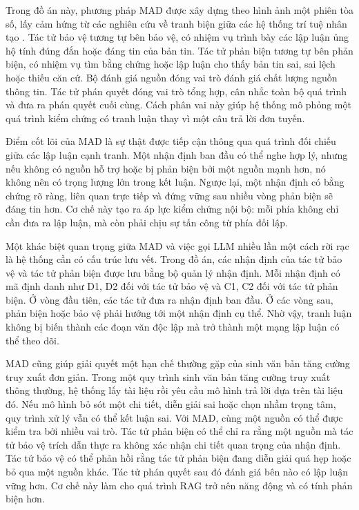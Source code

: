 ﻿\documentclass[oneside,a4paper,12pt]{extreport}
\begin{document}
Trong đồ án này, phương pháp MAD được xây dựng theo hình ảnh một phiên tòa số, lấy cảm hứng từ các nghiên cứu về tranh biện giữa các hệ thống trí tuệ nhân tạo \cite{irving2018debate,du2023improving}. Tác tử bảo vệ tương tự bên bảo vệ, có nhiệm vụ trình bày các lập luận ủng hộ tính đúng đắn hoặc đáng tin của bản tin. Tác tử phản biện tương tự bên phản biện, có nhiệm vụ tìm bằng chứng hoặc lập luận cho thấy bản tin sai, sai lệch hoặc thiếu căn cứ. Bộ đánh giá nguồn đóng vai trò đánh giá chất lượng nguồn thông tin. Tác tử phán quyết đóng vai trò tổng hợp, cân nhắc toàn bộ quá trình và đưa ra phán quyết cuối cùng. Cách phân vai này giúp hệ thống mô phỏng một quá trình kiểm chứng có tranh luận thay vì một câu trả lời đơn tuyến.

Điểm cốt lõi của MAD là sự thật được tiếp cận thông qua quá trình đối chiếu giữa các lập luận cạnh tranh. Một nhận định ban đầu có thể nghe hợp lý, nhưng nếu không có nguồn hỗ trợ hoặc bị phản biện bởi một nguồn mạnh hơn, nó không nên có trọng lượng lớn trong kết luận. Ngược lại, một nhận định có bằng chứng rõ ràng, liên quan trực tiếp và đứng vững sau nhiều vòng phản biện sẽ đáng tin hơn. Cơ chế này tạo ra áp lực kiểm chứng nội bộ: mỗi phía không chỉ cần đưa ra lập luận, mà còn phải chịu sự tấn công từ phía đối lập.

Một khác biệt quan trọng giữa MAD và việc gọi LLM nhiều lần một cách rời rạc là hệ thống cần có cấu trúc lưu vết. Trong đồ án, các nhận định của tác tử bảo vệ và tác tử phản biện được lưu bằng bộ quản lý nhận định. Mỗi nhận định có mã định danh như D1, D2 đối với tác tử bảo vệ và C1, C2 đối với tác tử phản biện. Ở vòng đầu tiên, các tác tử đưa ra nhận định ban đầu. Ở các vòng sau, phản biện hoặc bảo vệ phải hướng tới một nhận định cụ thể. Nhờ vậy, tranh luận không bị biến thành các đoạn văn độc lập mà trở thành một mạng lập luận có thể theo dõi.

MAD cũng giúp giải quyết một hạn chế thường gặp của sinh văn bản tăng cường truy xuất đơn giản. Trong một quy trình sinh văn bản tăng cường truy xuất thông thường, hệ thống lấy tài liệu rồi yêu cầu mô hình trả lời dựa trên tài liệu đó. Nếu mô hình bỏ sót một chi tiết, diễn giải sai hoặc chọn nhầm trọng tâm, quy trình xử lý vẫn có thể kết luận sai. Với MAD, cùng một nguồn có thể được kiểm tra bởi nhiều vai trò. Tác tử phản biện có thể chỉ ra rằng một nguồn mà tác tử bảo vệ trích dẫn thực ra không xác nhận chi tiết quan trọng của nhận định. Tác tử bảo vệ có thể phản hồi rằng tác tử phản biện đang diễn giải quá hẹp hoặc bỏ qua một nguồn khác. Tác tử phán quyết sau đó đánh giá bên nào có lập luận vững hơn. Cơ chế này làm cho quá trình RAG trở nên năng động và có tính phản biện hơn.
\end{document}
